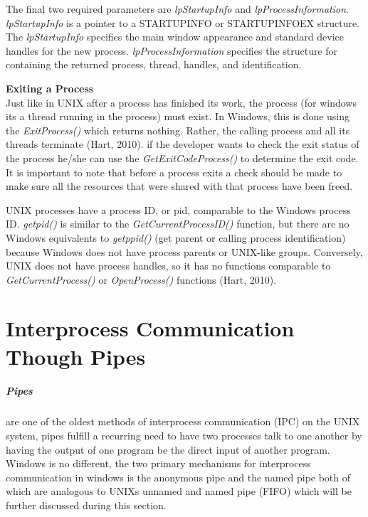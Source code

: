 \documentclass[11pt]{report}
\begin{document}
The final two required parameters are \textit{lpStartupInfo} and \textit{lpProcessInformation}. \textit{lpStartupInfo} is a pointer to a STARTUPINFO or STARTUPINFOEX structure. The \textit{lpStartupInfo} specifies the main window appearance and standard device handles for the new process. \textit{lpProcessInformation} specifies the structure for containing the returned process, thread, handles, and identification.

\textbf{\large Exiting a Process}\\
Just like in UNIX after a process has finished its work, the process (for windows its a thread running in the process) must exist. In Windows, this is done using the \textit{ExitProcess()} which returns nothing. Rather, the calling process and all its threads terminate (Hart, 2010). if the developer wants to check the exit status of the process he/she can use the \textit{GetExitCodeProcess()} to determine the exit code. It is important to note that before a process exits a check should be made to make sure all the resources that were shared with that process have been freed.

UNIX processes have a process ID, or pid, comparable to the Windows process ID. \textit{getpid()} is similar to the \textit{GetCurrentProcessID()} function, but there are no Windows equivalents to \textit{getppid()} (get parent or calling process identification) because Windows does not have process parents or UNIX-like groups. Conversely, UNIX does not have process handles, so it has no functions comparable to \textit{GetCurrentProcess()} or \textit{OpenProcess()} functions (Hart, 2010).

\chapter{Interprocess Communication Though Pipes}
\paragraph{Pipes} are one of the oldest methods of interprocess communication (IPC) on the UNIX system, pipes fulfill a recurring need to have two processes talk to one another by having the output of one program be the direct input of another program. Windows is no different, the  two primary mechanisms for interprocess communication in windows is the anonymous pipe and the named pipe both of which are analogous to UNIXs unnamed and named pipe (FIFO) which will be further discussed during this section.
\end{document}
